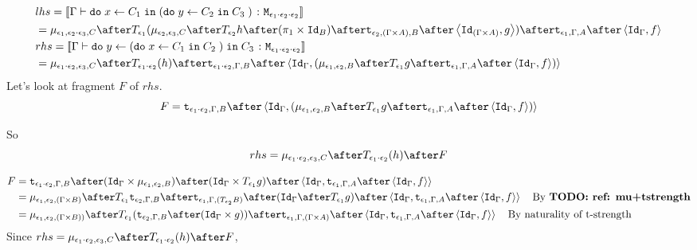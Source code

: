{\begin{align}
    &lhs =  \deno{\gtyperelation{\doin{x}{C_1}{(\doin{y}{C_2}{C_3})}}{\M{\e_1\dot\e_2\dot\e_2}}} \\
    & = \bind{\e_1}{\e_2\dot\e_3}{C}\after\T{
        \e_1}{(\bind{\e_2}{\e_3}{C}\after\T{\e_2}{h\after(\p \times \Id{B})}\after\tstrength{\e_2}{(\G\times A)}{B}\after\pr{\Id{(\G\times A)}}{g}
        )}\after\tstrength{\e_1}{\G}{A}\after\pr{\idg}{f}\\
    & rhs = \deno{\gtyperelation{\doin{y}{(\doin{x}{C_1}{C_2})}{C_3}}{\M{\e_1\dot\e_2\dot\e_2}}}  \\
    & = \bind{\e_1\dot\e_2}{\e_3}{C}\after\T{\e_1\dot\e_2}{(h)}\after\tstrength{\e_1\dot\e_2}{\G}{B}\after\pr{\idg}{(\bind{\e_1}{\e_2}{B}\after\T{\e_1}{g}\after\tstrength{\e_1}{\G}{A}\after\pr{\idg}{f})} \\
\end{align}
Let's look at fragment $F$ of $rhs$.
\begin{equation}
    F = \tstrength{\e_1\dot\e_2}{\G}{B}\after\pr{\idg}{(\bind{\e_1}{\e_2}{B}\after\T{\e_1}{g}\after\tstrength{\e_1}{\G}{A}\after\pr{\idg}{f})}
\end{equation}

So 
\begin{equation}
    rhs = \bind{\e_1\dot\e_2}{\e_3}{C}\after\T{\e_1\dot\e_2}{(h)}\after F
\end{equation}

\begin{equation}
    \begin{split}
        F & = \tstrength{\e_1\dot\e_2}{\G}{B}\after(\idg\times\bind{\e_1}{\e_2}{B})\after(\idg\times\T{\e_1}{g})\after\pr{\idg}{\tstrength{\e_1}{\G}{A}\after\pr{\idg}{f}}\\
        &  = \bind{\e_1}{\e_2}{(\G\times B)} \after \T{\e_1}{\tstrength{\e_2}{\G}{B}} \after\tstrength{\e_1}{\G}{(\T{\e_2}{B})} \after (\idg \after\T{\e_1}{g})\after\pr{\idg}{\tstrength{\e_1}{\G}{A}\after\pr{\idg}{f}}\qt{By \todo{ref: mu+tstrength}}
        \\ & = \bind{\e_1}{\e_2}{(\G \times B))} \after \T{\e_1}{(\tstrength{\e_2}{\G}{B} \after (\idg \times g))} \after \tstrength{\e_1}{\G}{(\G \times A)} \after \pr{\idg}{\tstrength{\e_1}{\G}{A}\after\pr{\idg}{f}}\qt{By naturality of t-strength}
    \end{split}
\end{equation}
Since
$
    rhs = \bind{\e_1\dot\e_2}{\e_3}{C}\after\T{\e_1\dot\e_2}{(h)}\after F
$, 

}
